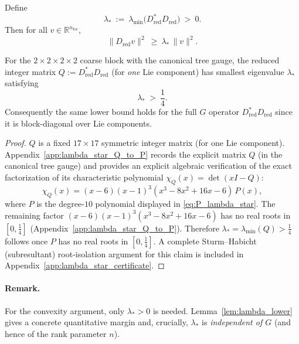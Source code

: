 \begin{definition}\label{def:lambda_star}
Define
\[
\lambda_\ast\ :=\ \lambda_{\min}\big(D_{\mathrm{red}}^\ast D_{\mathrm{red}}\big)\ >\ 0.
\]
Then for all $v\in\mathbb R^{n_{\mathrm{loc}}}$,
\begin{equation}\label{eq:curl_coercive}
\|D_{\mathrm{red}}v\|^2\ \ge\ \lambda_\ast\,\|v\|^2.
\end{equation}
\end{definition}

\begin{lemma}\label{lem:lambda_lower}
For the $2\times2\times2\times2$ coarse block with the canonical tree gauge, the reduced integer matrix
$Q:=D_{\mathrm{red}}^\ast D_{\mathrm{red}}$ (for \emph{one} Lie component) has smallest eigenvalue $\lambda_\ast$ satisfying
\[
\lambda_\ast\ >\ \frac14.
\]
Consequently the same lower bound holds for the full $G$ operator $D_{\mathrm{red}}^\ast D_{\mathrm{red}}$ since it is block-diagonal over Lie components.
\end{lemma}

\begin{proof}
$Q$ is a fixed $17\times 17$ symmetric integer matrix (for one Lie component).
Appendix~\ref{app:lambda_star_Q_to_P} records the explicit matrix $Q$ (in the canonical tree gauge) and provides an explicit algebraic verification of the exact factorization
of its characteristic polynomial $\chi_Q(x)=\det(xI-Q)$:
\[
\chi_Q(x)=(x-6)(x-1)^3(x^3-8x^2+16x-6)\,P(x),
\]
where $P$ is the degree-$10$ polynomial displayed in \eqref{eq:P_lambda_star}.
The remaining factor $(x-6)(x-1)^3(x^3-8x^2+16x-6)$ has no real roots in $[0,\tfrac14]$ (Appendix~\ref{app:lambda_star_Q_to_P}).
Therefore $\lambda_\ast=\lambda_{\min}(Q)>\tfrac14$ follows once $P$ has no real roots in $[0,\tfrac14]$.
A complete Sturm--Habicht (subresultant) root-isolation argument for this claim is included in Appendix~\ref{app:lambda_star_certificate}.
\end{proof}

\paragraph{Remark.}
For the convexity argument, only $\lambda_\ast>0$ is needed. Lemma~\ref{lem:lambda_lower} gives a concrete quantitative margin and,
crucially, $\lambda_\ast$ is \emph{independent of $G$} (and hence of the rank parameter $n$).

